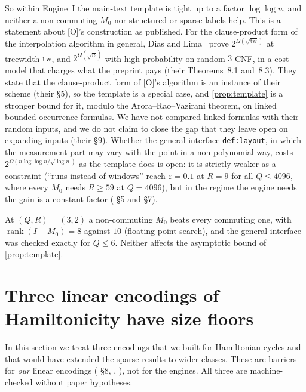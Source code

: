 \documentclass[10pt]{amsart}
\theoremstyle{plain}
\theoremstyle{definition}
\theoremstyle{remark}
\numberwithin{equation}{section}
\newcommand{\Oa}{\textup{[O]}}
\newcommand{\rk}{\operatorname{rank}}
\begin{document}
\noindent So within Engine~I the main-text template is tight up to a factor $\log\log n$, and neither a
non-commuting $M_0$ nor structured or sparse labels help. This is a statement about \Oa's construction
as published. For the clause-product form of the interpolation algorithm in general, Dias and
Lima~\cite{DL26} prove $2^{\Omega(\sqrt{\mathrm{tw}})}$ at treewidth $\mathrm{tw}$, and
$2^{\Omega(\sqrt n)}$ with high probability on random $3$-CNF, in a cost model that charges what the
preprint pays (their Theorems~8.1 and~8.3). They state that the clause-product form of \Oa's
algorithm is an instance of their scheme (their \S5), so the template is a special case, and
\cref{prop:template} is a stronger bound for it, modulo the Arora--Rao--Vazirani theorem, on linked
bounded-occurrence formulas. We have not compared linked formulas with their random inputs, and we do
not claim to close the gap that they leave open on expanding inputs (their \S9). Whether the general
interface \texttt{def:layout}, in which the measurement part may vary with the point in a
non-polynomial way, costs $2^{\Omega(n\log\log n/\sqrt{\log n})}$ as the template does is open: it is
strictly weaker as a constraint (``runs instead of windows'' reach $\varepsilon=0.1$ at $R=9$ for all $Q\le4096$, where every
$M_0$ needs $R\ge59$ at $Q=4096$), but in the regime the engine needs the gain is a constant factor
( \S5 and \S7).

\begin{remark}\label{rem:noncomm}
At $(Q,R)=(3,2)$ a non-commuting $M_0$ beats every commuting one, with $\rk(I-M_0)=8$ against $10$
(floating-point search), and the general interface was checked exactly for $Q\le6$. Neither affects
the asymptotic bound of \cref{prop:template}.
\end{remark}

\section{Three linear encodings of Hamiltonicity have size floors}\label{sec:encodings}

In this section we treat three encodings that we built for Hamiltonian cycles and that would have
extended the sparse results to wider classes. These are barriers for \emph{our} linear encodings
( \S8, , ), not for
the engines. All three are machine-checked without paper hypotheses.
\end{document}
